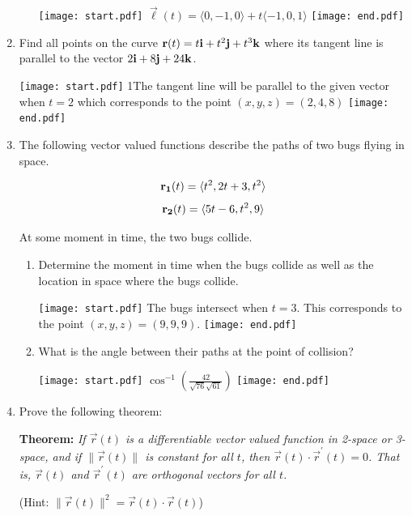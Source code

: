 \documentclass[12pt]{article}
\begin{document}
\begin{enumerate}
\begin{enumerate}
\texttt{[image: start.pdf]}
{{$\overrightarrow{\ell}(t)=\langle 0,-1,0 \rangle + t\langle -1, 0, 1\rangle$}}
\texttt{[image: end.pdf]}


\end{enumerate}

\item Find all points on the curve ${\bf r}(t)=t{\bf i}+t^2{\bf j}+t^3{\bf k}$ where its tangent line is parallel to the vector $2{\bf i}+8{\bf j}+24{\bf k}$.

\texttt{[image: start.pdf]}
{{{1\linewidth}{The tangent line will be parallel to the given vector when $t=2$ which corresponds to the point $(x,y,z)=(2,4,8)$}}}
\texttt{[image: end.pdf]}


\item The following vector valued functions describe the paths of two bugs flying in space.  

$${\bf r_1}(t)=\langle t^2, 2t+3, t^2\rangle$$
$${\bf r_2}(t)=\langle 5t-6, t^2, 9\rangle$$

At some moment in time, the two bugs collide.

\begin{enumerate}

\item Determine the moment in time when the bugs collide as well as the location in space where the bugs collide.

\texttt{[image: start.pdf]}
{{The bugs intersect when $t=3$.  This corresponds to the point $(x,y,z)=(9,9,9)$.}}
\texttt{[image: end.pdf]}


\item What is the angle between their paths at the point of collision?

\texttt{[image: start.pdf]}
{{$\cos^{-1}\left(\frac{42}{\sqrt{76}\sqrt{61}}\right)$}}
\texttt{[image: end.pdf]}


\end{enumerate}

\item Prove the following theorem:

{\bf Theorem:} \emph{If $\overrightarrow{r}(t)$ is a differentiable vector valued function in 2-space or 3-space, and if $\|\overrightarrow{r}(t)\|$ is constant for all $t$, then $\overrightarrow{r}(t)\cdot\overrightarrow{r}^{\prime}(t)=0$.  That is, $\overrightarrow{r}(t)$ and $\overrightarrow{r}^{\prime}(t)$ are orthogonal vectors for all $t$.}

(Hint: $\|\overrightarrow{r}(t)\|^2=\overrightarrow{r}(t)\cdot\overrightarrow{r}(t)$)


\end{enumerate}
\end{document}
